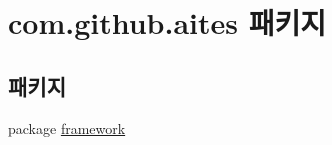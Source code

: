 \hypertarget{namespacecom_1_1github_1_1aites}{}\section{com.\+github.\+aites 패키지}
\label{namespacecom_1_1github_1_1aites}
\subsection*{패키지}
\begin{DoxyCompactItemize}
\item 
package \mbox{\hyperlink{namespacecom_1_1github_1_1aites_1_1framework}{framework}}
\end{DoxyCompactItemize}
